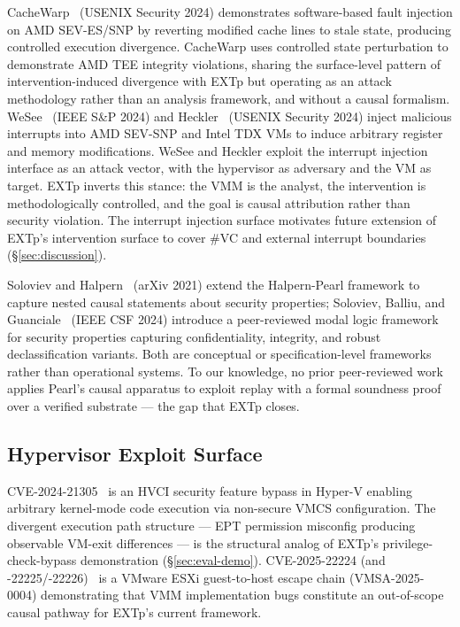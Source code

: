 \documentclass[conference]{IEEEtran}
\begin{document}
CacheWarp~\cite{zhang2024cachewarp} (USENIX Security 2024)
demonstrates software-based fault injection on AMD SEV-ES/SNP by
reverting modified cache lines to stale state, producing controlled
execution divergence. CacheWarp uses controlled state perturbation
to demonstrate AMD TEE integrity violations, sharing the
surface-level pattern of intervention-induced divergence with EXTp
but operating as an attack methodology rather than an analysis
framework, and without a causal formalism.
WeSee~\cite{schlueter2024wesee} (IEEE S\&P 2024) and
Heckler~\cite{schlueter2024heckler} (USENIX Security 2024) inject
malicious interrupts into AMD SEV-SNP and Intel TDX VMs to induce
arbitrary register and memory modifications. WeSee and Heckler
exploit the interrupt injection interface as an attack vector, with
the hypervisor as adversary and the VM as target. EXTp inverts this
stance: the VMM is the analyst, the intervention is methodologically
controlled, and the goal is causal attribution rather than security
violation. The interrupt injection surface motivates future
extension of EXTp's intervention surface to cover \#VC and external
interrupt boundaries (\S\ref{sec:discussion}).

Soloviev and Halpern~\cite{soloviev2021nested} (arXiv 2021) extend
the Halpern-Pearl framework to capture nested causal statements
about security properties; Soloviev, Balliu, and
Guanciale~\cite{soloviev2024modal} (IEEE CSF 2024) introduce a
peer-reviewed modal logic framework for security properties
capturing confidentiality, integrity, and robust declassification
variants. Both are conceptual or specification-level frameworks
rather than operational systems. To our knowledge, no prior
peer-reviewed work applies Pearl's causal apparatus to exploit
replay with a formal soundness proof over a verified substrate ---
the gap that EXTp closes.

\subsection{Hypervisor Exploit Surface}

CVE-2024-21305~\cite{tandasat2024hvci} is an HVCI security feature
bypass in Hyper-V enabling arbitrary kernel-mode code execution via
non-secure VMCS configuration. The divergent execution path
structure --- EPT permission misconfig producing observable VM-exit
differences --- is the structural analog of EXTp's
privilege-check-bypass demonstration (\S\ref{sec:eval-demo}).
CVE-2025-22224 (and -22225/-22226)~\cite{broadcom2025vmsa} is a
VMware ESXi guest-to-host escape chain (VMSA-2025-0004) demonstrating
that VMM implementation bugs constitute an out-of-scope causal
pathway for EXTp's current framework.
\end{document}
